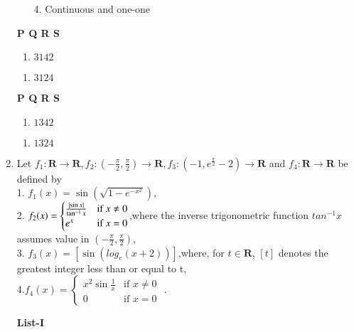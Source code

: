 \documentclass[journal,12pt,twocolumn]{IEEEtran}
\theoremstyle{remark}
\begin{document}
\begin{enumerate}
\begin{multicols}{2}
\begin{enumerate}
					\item[4.]  Continuous and one-one
				\end{enumerate}
		\end{multicols}
		\begin{multicols}{2}
			\textbf{   P Q R S}
			\begin{enumerate}[label=(\alph*)]
				\item $ 3 1 4 2$
			\end{enumerate}
			\begin{enumerate}[label=(\alph*), start=3]
				\item$ 3 1 2 4$
			\end{enumerate}
			\columnbreak
			\textbf{   P Q R S }
			\begin{enumerate}[label=(\alph*), start=2]
				\item $1 3 4 2$ 
			\end{enumerate}
			\begin{enumerate}[label=(\alph*)]
				\item $1 3 2 4$
			\end{enumerate}
		\end{multicols}
            \item Let $f_1: \textbf{R}\rightarrow \textbf{R},f_2:(-\frac{\pi}{2},\frac{\pi}{2})\rightarrow \textbf{R}, f_3:(-1,e^\frac{\pi}{2}-2)\rightarrow \textbf{R}$ and $f_4: \textbf{R}\rightarrow \textbf{R}$ be defined by \\
            1. $f_1(x)=\sin({\sqrt{1-e^{-x^2}}})$, \\
            2. $f_2(x) =
             \begin{cases}
		 \frac{\left\vert\sin{x}\right\vert}{\tan^{-1}x} & \text{if } x \neq 0 \\
                 e^x & \text{if } x = 0 
                 \end{cases}$,where the inverse trigonometric function $tan^{-1}x $ assumes value in $(-\frac{\pi}{2},\frac{\pi}{2})$,\\
            3. $f_3(x)=[\sin({log_e(x+2)})]$,where, for $t\in \textbf{R}$, $[t]$ denotes the greatest integer less than or equal to t, \\
            4.$f_4(x) =
        \begin{cases}
                 x^2\sin{\frac{1}{x}} & \text{if } x \neq 0 \\
                 0 & \text{if } x = 0 
                 \end{cases}$ .
                 \begin{multicols}{2} 
				\textbf{List-I} 

\end{multicols}
\end{enumerate}
\end{document}
